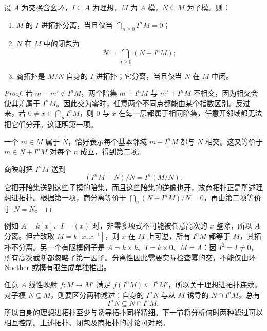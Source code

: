 \begin{proposition}\label{g5:prop:adic-closure}
	设 \(A\) 为交换含幺环，\(I\subseteq A\) 为理想，\(M\) 为 \(A\) 模，\(N\subseteq M\) 为子模。则：
	\begin{enumerate}
		\item \(M\) 的 \(I\) 进拓扑分离，当且仅当 \(\bigcap_{n\geq0}I^nM=0\)；
		\item \(N\) 在 \(M\) 中的闭包为
		\[
			\overline N=\bigcap_{n\geq0}(N+I^nM);
		\]
		\item 商拓扑是 \(M/N\) 自身的 \(I\) 进拓扑；它分离，当且仅当 \(N\) 在 \(M\) 中闭。
	\end{enumerate}
\end{proposition}
\begin{proof}
	若 \(m-m'\notin I^nM\)，两个陪集 \(m+I^nM\) 与 \(m'+I^nM\) 不相交，因为相交会使其差属于 \(I^nM\)。因此交为零时，任意两个不同点都能由某个指数区别。反过来，若 \(0\ne x\in\bigcap_nI^nM\)，则 \(0\) 与 \(x\) 在每一层都属于相同陪集，任意开邻域都无法把它们分开。这证明第一项。

	一个 \(m\in M\) 属于 \(\overline N\)，恰好表示每个基本邻域 \(m+I^nM\) 都与 \(N\) 相交。这又等价于 \(m\in N+I^nM\) 对每个 \(n\) 成立，得到第二项。

	商映射把 \(I^nM\) 送到
	\[
		(I^nM+N)/N=I^n(M/N).
	\]
	它把开陪集送到这些子模的陪集，而且这些陪集的逆像也开，故商拓扑正是所述理想进拓扑。根据第一项，商分离等价于
	\(\bigcap_n(N+I^nM)/N=0\)，再由第二项等价于 \(\overline N=N\)。
\end{proof}

例如 \(A=k[x]\)、\(I=(x)\) 时，非零多项式不可能被任意高次的 \(x\) 整除，所以 \(A\) 分离。但若改取 \(M=k[x,x^{-1}]\)，则 \(x\) 在 \(M\) 上可逆，所有 \(I^nM\) 都等于 \(M\)，其拓扑不分离。另一个有限模例子是 \(A=k\times k\)、\(I=k\times0\)、\(M=A\)：因 \(I^2=I\ne0\)，所有高次截断都忽略了第一因子。分离性因此需要实际检查幂的交，不能仅由环 Noether 或模有限生成单独推出。

\ProseParagraphBreak

任意 \(A\) 线性映射 \(f:M\to M'\) 满足 \(f(I^nM)\subseteq I^nM'\)，所以关于理想进拓扑连续。对子模 \(N\subseteq M\)，则要区分两种滤过：自身的 \(I^nN\) 与从 \(M\) 诱导的 \(N\cap I^nM\)。总有
\[
	I^nN\subseteq N\cap I^nM,
\]
所以自身的理想进拓扑至少与诱导拓扑同样精细。下一节将分析何时两种滤过可以相互控制。上述拓扑、闭包及商拓扑的讨论可对照\cite[第8节，第55--56页]{Matsumura1989}。

